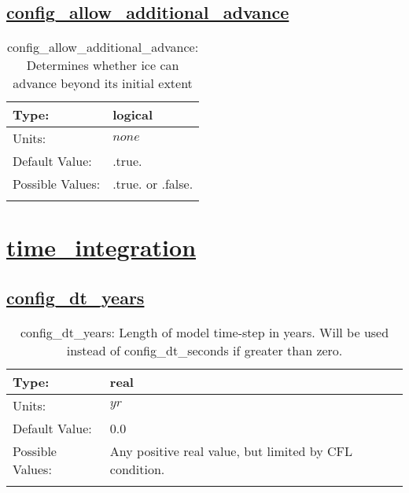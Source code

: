 \subsection[config\_allow\_additional\_advance]{\hyperref[sec:nm_tab_li_model]{config\_allow\_additional\_advance}}
\label{subsec:nm_sec_config_allow_additional_advance}
\begin{center}
\begin{longtable}{| p{2.0in} | p{4.0in} |}
    \hline
    Type: & logical \\
    \hline
    Units: & $none$ \\
    \hline
    Default Value: & .true. \\
    \hline
    Possible Values: & .true. or .false. \\
    \hline
    \caption{config\_allow\_additional\_advance: Determines whether ice can advance beyond its initial extent}
\end{longtable}
\end{center}
\section[time\_integration]{\hyperref[sec:nm_tab_time_integration]{time\_integration}}
\label{sec:nm_sec_time_integration}
\subsection[config\_dt\_years]{\hyperref[sec:nm_tab_time_integration]{config\_dt\_years}}
\label{subsec:nm_sec_config_dt_years}
\begin{center}
\begin{longtable}{| p{2.0in} | p{4.0in} |}
    \hline
    Type: & real \\
    \hline
    Units: & $yr$ \\
    \hline
    Default Value: & 0.0 \\
    \hline
    Possible Values: & Any positive real value, but limited by CFL condition. \\
    \hline
    \caption{config\_dt\_years: Length of model time-step in years.  Will be used instead of config\_dt\_seconds if greater than zero.}
\end{longtable}
\end{center}
